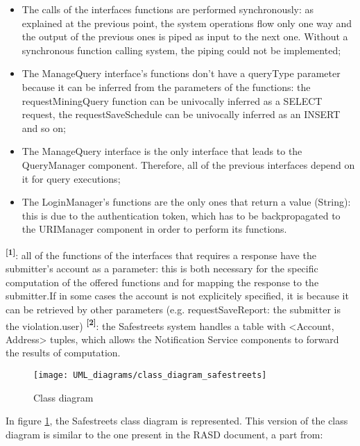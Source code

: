 \begin{itemize}
    \item The calls of the interfaces functions are performed synchronously: as explained at the previous point, the system operations flow only one way and the output of the previous ones is piped as input to the next one. Without a synchronous function calling system, the piping could not be implemented;
    \item The ManageQuery interface's functions don't have a queryType parameter because it can be inferred from the parameters of the functions: the requestMiningQuery function can be univocally inferred as a SELECT request, the requestSaveSchedule can be univocally inferred as an INSERT and so on;
    \item The ManageQuery interface is the only interface that leads to the QueryManager component. Therefore, all of the previous interfaces depend on it for query executions;
    \item The LoginManager's functions are the only ones that return a value (String): this is due to the authentication token, which has to be backpropagated to the URIManager component in order to perform its functions.
\end{itemize}
\textbf{\textsuperscript{[1]}}: all of the functions of the interfaces that requires a response have the submitter's account as a parameter: this is both necessary for the specific computation of the offered functions and for mapping the response to the submitter.If in some cases the account is not explicitely specified, it is because it can be retrieved by other parameters (e.g. requestSaveReport: the submitter is the violation.user)\newline
\textbf{\textsuperscript{[2]}}: the Safestreets system handles a table with <Account, Address> tuples, which allows the Notification Service components to forward the results of computation.
\begin{figure}[H]
    \centering
    \texttt{[image: UML\_diagrams/class\_diagram\_safestreets]}
    \caption{Class diagram}
    \label{fig:class_diagram}
\end{figure}
In figure \ref{fig:class_diagram}, the Safestreets class diagram is represented. This version of the class diagram is similar to the one present in the RASD document, a part from:
